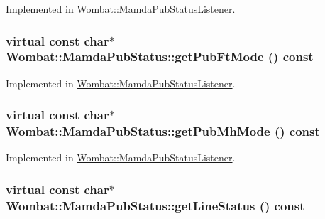 Implemented in \hyperlink{classWombat_1_1MamdaPubStatusListener_e18c97b1a454d45755dd48f8a56a742d}{Wombat::Mamda\-Pub\-Status\-Listener}.\hypertarget{classWombat_1_1MamdaPubStatus_11e1cacd11604090bf1c5387b0ac7f43}{
\subsubsection[getPubFtMode]{\setlength{\rightskip}{0pt plus 5cm}virtual const char$\ast$ Wombat::Mamda\-Pub\-Status::get\-Pub\-Ft\-Mode () const}}
\label{classWombat_1_1MamdaPubStatus_11e1cacd11604090bf1c5387b0ac7f43}




Implemented in \hyperlink{classWombat_1_1MamdaPubStatusListener_1015e3575a3a8473801927af37687d66}{Wombat::Mamda\-Pub\-Status\-Listener}.\hypertarget{classWombat_1_1MamdaPubStatus_e79db14a783d2831413c89f1e3c4527e}{
\subsubsection[getPubMhMode]{\setlength{\rightskip}{0pt plus 5cm}virtual const char$\ast$ Wombat::Mamda\-Pub\-Status::get\-Pub\-Mh\-Mode () const}}
\label{classWombat_1_1MamdaPubStatus_e79db14a783d2831413c89f1e3c4527e}




Implemented in \hyperlink{classWombat_1_1MamdaPubStatusListener_2cec9d2c120cdf4cfaab88ef273712aa}{Wombat::Mamda\-Pub\-Status\-Listener}.\hypertarget{classWombat_1_1MamdaPubStatus_553635179dab937c8ee88019f66ca0de}{
\subsubsection[getLineStatus]{\setlength{\rightskip}{0pt plus 5cm}virtual const char$\ast$ Wombat::Mamda\-Pub\-Status::get\-Line\-Status () const}}
\label{classWombat_1_1MamdaPubStatus_553635179dab937c8ee88019f66ca0de}




